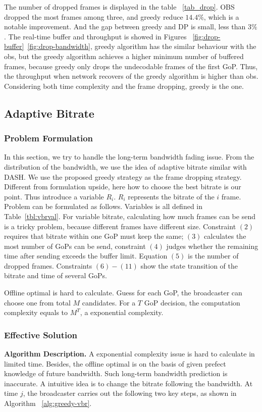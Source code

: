 

The number of dropped frames is displayed in the table ~\ref{tab_drop}. OBS dropped the most frames among three, and greedy reduce $14.4\%$, which is a notable improvement. And the gap between greedy and DP is small, less than $3\%$. The real-time buffer and throughput is showed in Figures ~\ref{fig:drop-buffer}~\ref{fig:drop-bandwidth}, greedy algorithm has the similar behaviour with the obs, but the greedy algorithm achieves a higher minimum number of buffered frames, because greedy only drops the undecodable frames of the first GoP. Thus, the throughput when network recovers of the greedy algorithm is higher than obs. Considering both time complexity and the frame dropping, greedy is the one.

\subsection{Adaptive Bitrate}
\subsubsection{Problem Formulation}


In this section, we try to handle the long-term bandwidth fading issue. From the distribution of the bandwidth, we use the idea of adaptive bitrate similar with DASH. We use the proposed greedy strategy as the frame dropping strategy. Different from formulation upside, here how to choose the best bitrate is our point. Thus introduce a variable $R_{i}$. $R_{i}$ represents the bitrate of the $i$ frame. Problem can be formulated as follows. Variables is all defined in Table~\ref{tbl:vbrval}. For variable bitrate, calculating how much frames can be send is a tricky problem, because different frames have different size. Constraint $(2)$ requires that bitrate within one GoP must keep the same; $(3)$ calculates the most number of GoPs can be send, constraint $(4)$ judges whether the remaining time after sending exceeds the buffer limit. Equation $(5)$ is the number of dropped frames. Constraints $(6)-(11)$ show the state transition of the bitrate and time of several GoPs.

Offline optimal is hard to calculate. Guess for each GoP, the broadcaster can choose one from total $M$ candidates. For a $T$ GoP decision, the computation complexity equals to $M^T$, a exponential complexity.

\subsubsection{Effective Solution}

\textbf{Algorithm Description.} A exponential complexity issue is hard to calculate in limited time. Besides, the offline optimal is on the basis of given prefect knowledge of future bandwidth. Such long-term bandwidth prediction is inaccurate. A intuitive idea is to change the bitrate following the bandwidth. At time $j$, the broadcaster carries out the following two key steps, as shown in Algorithm ~\ref{alg:greedy-vbr}.

